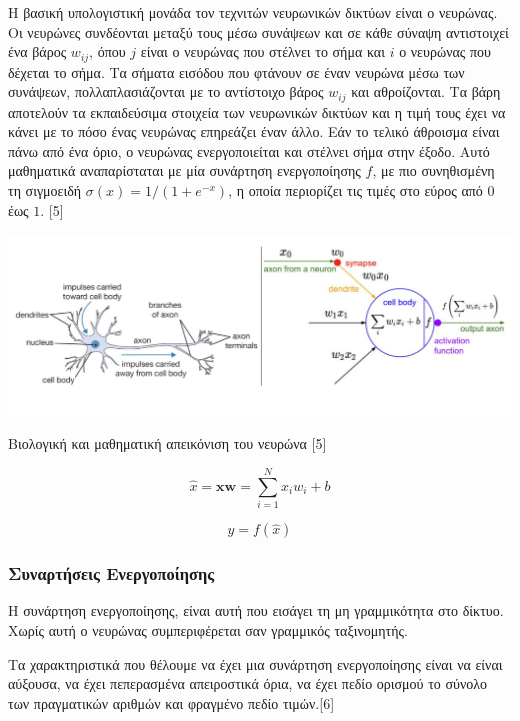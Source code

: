 Η βασική υπολογιστική μονάδα τον τεχνιτών νευρωνικών δικτύων είναι ο νευρώνας. Οι νευρώνες συνδέονται μεταξύ τους μέσω συνάψεων και σε κάθε σύναψη αντιστοιχεί ένα βάρος \(w_{ij}\), όπου \(j\) είναι ο νευρώνας που στέλνει το σήμα και \(i\) ο νευρώνας που δέχεται το σήμα. Τα σήματα εισόδου που φτάνουν σε έναν νευρώνα μέσω των συνάψεων, πολλαπλασιάζονται με το αντίστοιχο βάρος \(w_{ij}\) και αθροίζονται. Τα βάρη αποτελούν τα εκπαιδεύσιμα στοιχεία των νευρωνικών δικτύων και η τιμή τους έχει να κάνει με το πόσο ένας νευρώνας επηρεάζει έναν άλλο. Εάν το τελικό άθροισμα είναι πάνω από ένα όριο, ο νευρώνας ενεργοποιείται και στέλνει σήμα στην έξοδο. Αυτό μαθηματικά αναπαρίσταται με μία συνάρτηση ενεργοποίησης \(f\), με πιο συνηθισμένη τη σιγμοειδή $\sigma(x) ={1}/{(1 + e^{-x})}$, η οποία περιορίζει τις τιμές στο εύρος από \(0\) έως \(1\). [5]

\begin{Illustration}[!h] 
\centering
\includegraphics{images/image005.png} 
\caption{Βιολογική και μαθηματική απεικόνιση του νευρώνα [5]} 
\label{neuron-illustration}
\end{Illustration}

\noindent
\begin{minipage}{\textwidth}
\begin{equation}
\hat{x} = \mathbf{x} \mathbf{w} = \sum_{i=1}^{N} x_i w_i + b
\end{equation}

\begin{equation}
y = f(\hat{x})
\end{equation}
\end{minipage}

\subsubsection{Συναρτήσεις Ενεργοποίησης}
Η συνάρτηση ενεργοποίησης, είναι αυτή που εισάγει τη μη γραμμικότητα στο δίκτυο. Χωρίς αυτή ο νευρώνας συμπεριφέρεται σαν γραμμικός ταξινομητής. 

Τα χαρακτηριστικά που θέλουμε να έχει μια συνάρτηση ενεργοποίησης είναι να είναι αύξουσα, να έχει πεπερασμένα απειροστικά όρια, να έχει πεδίο ορισμού το σύνολο των πραγματικών αριθμών και φραγμένο πεδίο τιμών.[6]

